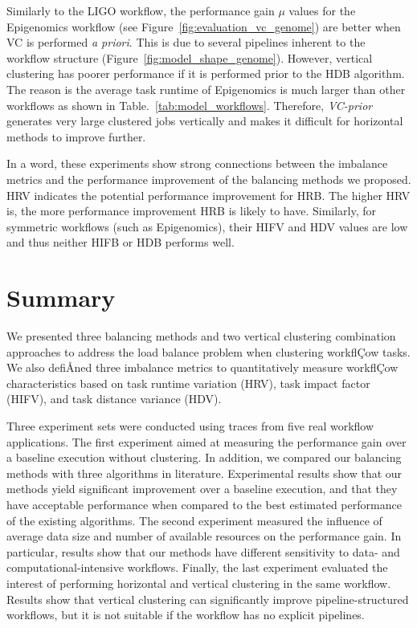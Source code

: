 Similarly to the LIGO workflow, the performance gain $\mu$ values for the Epigenomics workflow (see Figure~\ref{fig:evaluation_vc_genome}) are better when VC is performed \emph{a priori}. This is due to several pipelines inherent to the workflow structure (Figure~\ref{fig:model_shape_genome}). However, vertical clustering has poorer performance if it is performed prior to the HDB algorithm. The reason is the average task runtime of Epigenomics is much larger than other workflows as shown in Table.~\ref{tab:model_workflows}. Therefore, \emph{VC-prior} generates very large clustered jobs vertically and makes it difficult for horizontal methods to improve further. 


In a word, these experiments show strong connections between the imbalance metrics and the performance improvement of the balancing methods we proposed. HRV indicates the potential performance improvement for HRB. The higher HRV is, the more performance improvement HRB is likely to have. Similarly, for symmetric workflows (such as Epigenomics), their HIFV and HDV values are low and thus neither HIFB or HDB performs well. 




\section{Summary}

We presented three balancing methods and two vertical clustering combination approaches to address the load balance problem when clustering workflÇow tasks. We also defiÅned three imbalance metrics to quantitatively measure workflÇow characteristics based on task runtime variation (HRV), task impact factor (HIFV), and task distance variance (HDV).

Three experiment sets were conducted using traces from five real workflow applications. The first experiment aimed at measuring the performance gain over a baseline execution without clustering. In addition, we compared our balancing methods with three algorithms in literature. Experimental results show that our methods yield significant improvement over a baseline execution, and that they have acceptable performance when compared to the best estimated performance of the existing algorithms. The second experiment measured the influence of average data size and number of available resources on the performance gain. In particular, results show that our methods have different sensitivity to data- and computational-intensive workflows. Finally, the last experiment evaluated the interest of performing horizontal and vertical clustering in the same workflow. Results show that vertical clustering can significantly improve pipeline-structured workflows, but it is not suitable if the workflow has no explicit pipelines.

